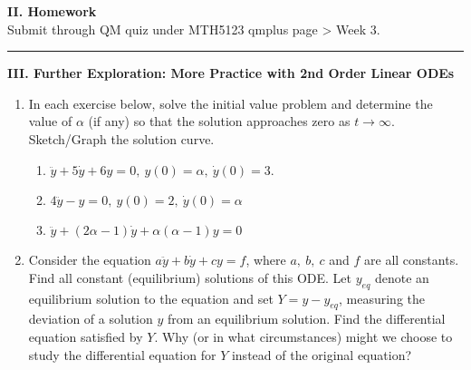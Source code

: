 \documentclass[11pt,a4paper,twoside]{article}
\begin{document}
	\textbf{II. Homework}\\
	Submit through QM quiz under MTH5123 qmplus page > Week 3.\\
	\rule{\textwidth}{0.4pt}
	\textbf{III. Further Exploration: More Practice with 2nd Order Linear ODEs}
	\begin{enumerate}[\bfseries A.]
		\item In each exercise below, solve the initial value problem and determine the value of $\alpha$ (if any) so that the solution approaches zero as $t \to \infty$. Sketch/Graph the solution curve.
		\begin{enumerate}[\bfseries 1)]
			\item $\ddot{y} + 5\dot{y} + 6y = 0,\ y(0) = \alpha,\ \dot{y}(0) = 3$.
			\item $4\ddot{y} - y = 0,\ y(0) = 2,\ \dot{y}(0) = \alpha$
			\item $\ddot{y} + (2\alpha - 1)\dot{y} + \alpha (\alpha -1)y = 0$
		\end{enumerate}
		\item Consider the equation $a\ddot{y} + b\dot{y} + cy = f$, where $a,\ b,\ c$ and $f$ are all constants. Find all constant (equilibrium) solutions of this ODE. Let $y_{eq}$ denote an equilibrium solution to the equation and set $Y = y-y_{eq}$,  measuring the deviation of a solution $y$ from an equilibrium solution. Find the differential equation satisfied by $Y$. Why (or in what circumstances) might we choose to study the differential equation for $Y$ instead of the original equation?
	\end{enumerate}
\end{document}
